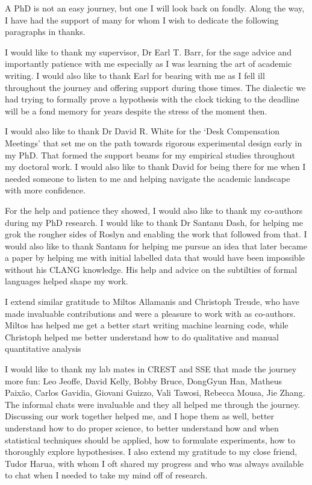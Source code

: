 A PhD is not an easy journey, but one I will look back on fondly. Along the way,
I have had the support of many for whom I wish to dedicate the following
paragraphs in thanks.

I would like to thank my supervisor, Dr Earl T. Barr, for the sage advice and
importantly patience with me especially as I was learning the art of
academic writing. I would also like to thank Earl for bearing with me as I fell
ill throughout the journey and offering support during those times. The
dialectic we had trying to formally prove a hypothesis with the clock ticking to
the deadline will be a fond memory for years despite the stress of the moment
then.

I would also like to thank Dr David R. White for the `Desk Compensation
Meetings' that set me on the path towards rigorous experimental design early in
my PhD. That formed the support beams for my empirical studies throughout my
doctoral work. I would also like to thank David for being there for me when I
needed someone to listen to me and helping navigate the academic landscape with
more confidence.

For the help and patience they showed, I would also like to thank my co-authors
during my PhD research. I would like to thank Dr Santanu Dash, for helping me
grok the rougher sides of Roslyn and enabling the work that followed from that.
I would also like to thank Santanu for helping me pursue an idea that later
became a paper by helping me with initial labelled data that would have been
impossible without his CLANG knowledge. His help and advice on the subtilties of
formal languages helped shape my work.

I extend similar gratitude to Miltos Allamanis and Christoph Treude, who have
made invaluable contributions and were a pleasure to work with as co-authors.
Miltos has helped me get a better start writing machine learning code, while
Christoph helped me better understand how to do qualitative and manual
quantitative analysis

I would like to thank my lab mates in CREST and SSE that made the journey more
fun: Leo Jeoffe, David Kelly, Bobby Bruce, DongGyun Han, Matheus Paix\~ao,
Carlos Gavidia, Giovani Guizzo, Vali Tawosi, Rebecca Mousa, Jie Zhang. The
informal chats were invaluable and they all helped me through the journey.
Discussing our work together helped me, and I hope them as well, better
understand how to do proper science, to better understand how and when
statistical techniques should be applied, how to formulate experiments, how to
thoroughly explore hypothesises. I also extend my gratitude to my close friend,
Tudor Harua, with whom I oft shared my progress and who was always
available to chat when I needed to take my mind off of research.

